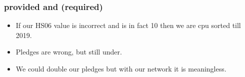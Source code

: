 \documentclass{beamer}
\begin{document}
\begin{frame}
    \frametitle{provided and (required)}
\vspace{0.5cm}
\vspace{0.5cm}
    \begin{itemize}
        \item If our HS06 value is incorrect and is in fact 10 then we are cpu sorted till 2019.
        \item Pledges are wrong, but still under.
        \item We could double our pledges but with our network it is meaningless.
    \end{itemize}
\end{frame}
\end{document}
